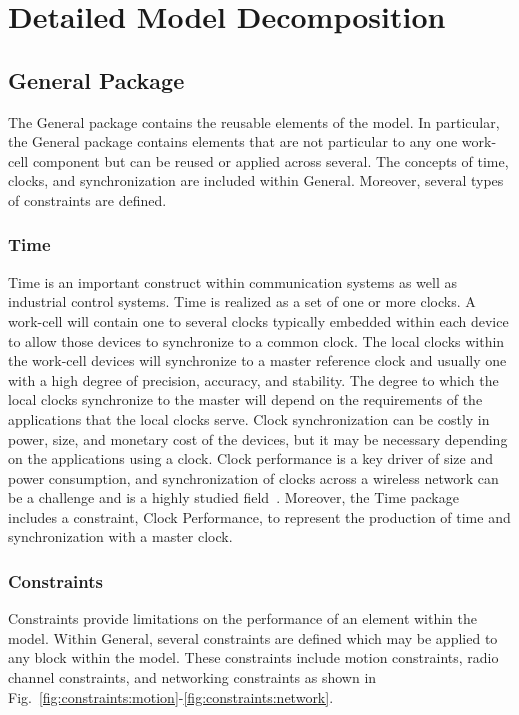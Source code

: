 \documentclass[journal, twoside]{IEEEtran}
\begin{document}
	\section{Detailed Model Decomposition}\label{sec:detailed-model}
	\subsection{General Package}
	The General package contains the reusable elements of the model.  In particular, the General package contains elements that are not particular to any one work-cell component but can be reused or applied across several.  The concepts of time, clocks, and synchronization are included within General.  Moreover, several types of constraints are defined.  
	
	\subsubsection{Time}
	Time is an important construct within communication systems as well as industrial control systems.  Time is realized as a set of one or more clocks. A work-cell will contain one to several clocks typically embedded within each device to allow those devices to synchronize to a common clock. The local clocks within the work-cell devices will synchronize to a master reference clock and usually one with a high degree of precision, accuracy, and stability.  The degree to which the local clocks synchronize to the master will depend on the requirements of the applications that the local clocks serve.  Clock synchronization can be costly in power, size, and monetary cost of the devices, but it may be necessary depending on the applications using a clock.  Clock performance is a key driver of size and power consumption, and synchronization of clocks across a wireless network can be a challenge and is a highly studied field~\cite{ClockSync.Mahmood2017,ClockSync.Geetha2017}. Moreover, the Time package includes a constraint, Clock Performance, to represent the production of time and synchronization with a master clock. 
	
	\subsubsection{Constraints}\label{sec:general:constraints}
	Constraints provide limitations on the performance of an element within the model.  Within General, several constraints are defined which may be applied to any block within the model. These constraints include motion constraints, radio channel constraints, and networking constraints as shown in Fig.~\ref{fig:constraints:motion}-\ref{fig:constraints:network}.  
	
\end{document}
